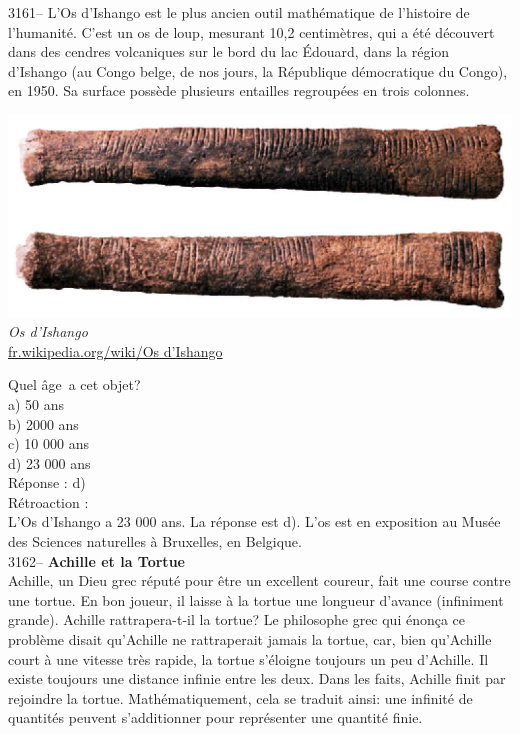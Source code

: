\documentclass[letterpaper, 12pt]{article}
\begin{document}
3161-- L'Os d'Ishango est le plus ancien outil math\'ematique de l'histoire de l'humanit\'e. C'est un os de loup, mesurant 10,2 centim\`etres, qui a \'et\'e d\'ecouvert dans des cendres volcaniques sur le bord du lac \'Edouard, dans la r\'egion d'Ishango (au Congo belge, de nos jours, la R\'epublique d\'emocratique du Congo), en 1950. Sa surface poss\`ede plusieurs entailles regroup\'ees en trois colonnes.
\begin{center}
\includegraphics[scale=0.5]{Ishango.eps}\\
\emph{{\small Os d'Ishango}}\\
\href{http://fr.wikipedia.org/wiki/Os_d\%27Ishango}{fr.wikipedia.org/wiki/Os d'Ishango}\\
\end{center}
Quel \og \^age\fg \ a cet objet?\\

a) 50 ans\\
b) 2000 ans\\
c) 10 000 ans\\
d) 23 000 ans\\

R\'eponse : d)\\

R\'etroaction :\\
L'Os d'Ishango a 23 000 ans.  La r\'eponse est d). L'os est en exposition au Mus\'ee des Sciences naturelles \`a Bruxelles, en Belgique.\\



3162-- {\bf Achille et la Tortue}\\
Achille, un Dieu grec r\'eput\'e pour \^etre un excellent coureur, fait une course contre une tortue. En bon joueur, il laisse \`a la tortue une longueur d'avance (infiniment grande). Achille rattrapera-t-il la tortue? Le philosophe grec qui \'enon\c ca ce probl\`eme disait qu'Achille ne rattraperait jamais la tortue, car, bien qu'Achille court \`a une vitesse tr\`es rapide, la tortue s'\'eloigne toujours un peu d'Achille. Il existe toujours une distance infinie entre les deux. Dans les faits, Achille finit par rejoindre la tortue. Math\'ematiquement, cela se traduit ainsi: une infinit\'e de quantit\'es peuvent s'additionner pour repr\'esenter une quantit\'e finie.\\
\end{document}
